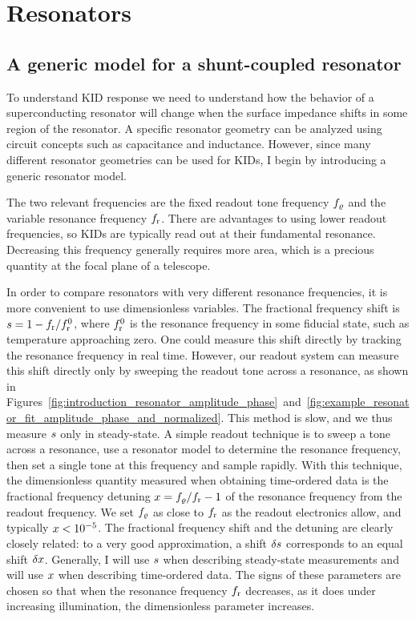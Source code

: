 \section{Resonators}
\label{sec:theory.resonator}

\subsection{A generic model for a shunt-coupled resonator}
\label{sec:theory.resonator.generic}

To understand KID response we need to understand how the behavior of a superconducting resonator will change when the surface impedance shifts in some region of the resonator.
A specific resonator geometry can be analyzed using circuit concepts such as capacitance and inductance.
However, since many different resonator geometries can be used for KIDs, I begin by introducing a generic resonator model.

The two relevant frequencies are the fixed readout tone frequency $f_\varrho$ and the variable resonance frequency $f_{\mathrm{r}}$.
There are advantages to using lower readout frequencies, so KIDs are typically read out at their fundamental resonance.
Decreasing this frequency generally requires more area, which is a precious quantity at the focal plane of a telescope.

In order to compare resonators with very different resonance frequencies, it is more convenient to use dimensionless variables.
The fractional frequency shift is
$s = 1 - f_{\mathrm{r}} / f_{\mathrm{r}}^0$,
where $f_{\mathrm{r}}^0$ is the resonance frequency in some fiducial state, such as temperature approaching zero.
One could measure this shift directly by tracking the resonance frequency in real time.
However, our readout system can measure this shift directly only by sweeping the readout tone across a resonance, as shown in Figures~\ref{fig:introduction_resonator_amplitude_phase}~and~\ref{fig:example_resonator_fit_amplitude_phase_and_normalized}.
This method is slow, and we thus measure $s$ only in steady-state.
A simple readout technique is to sweep a tone across a resonance,  use a resonator model to determine the resonance frequency, then  set a single tone at this frequency and sample rapidly.
With this technique, the dimensionless quantity measured when obtaining time-ordered data is the fractional frequency detuning
$x = f_\varrho / f_{\mathrm{r}} - 1$ of the resonance frequency from the readout frequency.
We set $f_\varrho$ as close to $f_{\mathrm{r}}$ as the readout electronics allow, and typically $x < \num{e-5}$.
The fractional frequency shift and the detuning are clearly closely related: to a very good approximation, a shift $\delta s$ corresponds to an equal shift $\delta x$.
Generally, I will use $s$ when describing steady-state measurements and will use $x$ when describing time-ordered data.
The signs of these parameters are chosen so that when the resonance frequency $f_{\mathrm{r}}$ decreases, as it does under increasing illumination, the dimensionless parameter increases.

